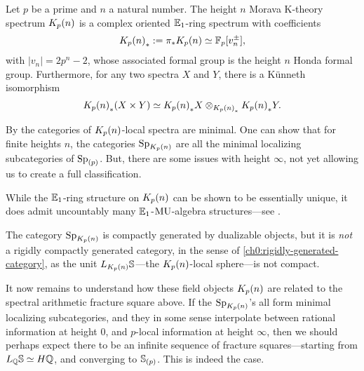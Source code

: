 \begin{proposition}
    \label{ch0:prop:properties-of-K(n)}
    Let $p$ be a prime and $n$ a natural number. The height $n$ Morava K-theory spectrum $\Kpn$ is a complex oriented $\E_1$-ring spectrum with coefficients 
    \[\Kpn_*:=\pi_* \Kpn \simeq \F_p[v_n^{\pm}],\]
    with $|v_n|=2p^n-2$, whose associated formal group is the height $n$ Honda formal group. Furthermore, for any two spectra $X$ and $Y$, there is a Künneth isomorphism 
    \[\Kpn_*(X\times Y)\simeq \Kpn_*X\otimes_{\Kpn_*} \Kpn_*Y.\]
\end{proposition}

\begin{remark}
    By \cite[7.5]{hovey-strickland_99} the categories of $\Kpn$-local spectra are minimal. One can show that for finite heights $n$, the categories $\Sp_\Kpn$ are all the minimal localizing subcategories of $\Sp_{(p)}$. But, there are some issues with height $\infty$, not yet allowing us to create a full classification. 
\end{remark}

\begin{remark}
    While the $\E_1$-ring structure on $\Kpn$ can be shown to be essentially unique, it does admit uncountably many $\E_1$-$\MU$-algebra structures---see \cite{angeltveit_2011}. 
\end{remark}

\begin{remark}
    \label{ch0:rm:SpKn-not-rigidly-generated}
    The category $\Sp_\Kpn$ is compactly generated by dualizable objects, but it is \emph{not} a rigidly compactly generated category, in the sense of \cref{ch0:rigidly-generated-category}, as the unit $L_{\Kpn}\S$---the $\Kpn$-local sphere---is not compact.  
\end{remark}

It now remains to understand how these field objects $\Kpn$ are related to the spectral arithmetic fracture square above. If the $\Sp_\Kpn$'s all form minimal localizing subcategories, and they in some sense interpolate between rational information at height $0$, and $p$-local information at height $\infty$, then we should perhaps expect there to be an infinite sequence of fracture squares---starting from $L_\Q \S \simeq H\Q$, and converging to $\S_{(p)}$. This is indeed the case. 

